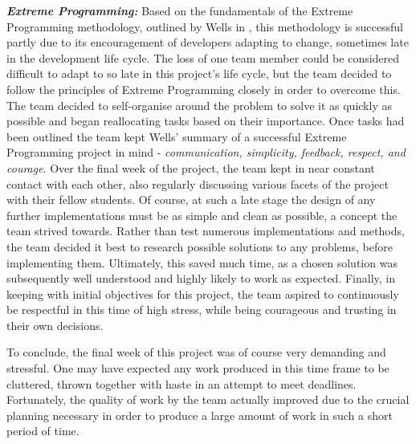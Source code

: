 \textbf{\textit{Extreme Programming:}} Based on the fundamentals of the Extreme Programming methodology, outlined by Wells in \cite{xp}, this methodology is successful partly due to its encouragement of developers adapting to change, sometimes late in the development life cycle. The loss of one team member could be considered difficult to adapt to so late in this project's life cycle, but the team decided to follow the principles of Extreme Programming closely in order to overcome this. The team decided to self-organise around the problem to solve it as quickly as possible \cite{xp} and began reallocating tasks based on their importance. Once tasks had been outlined the team kept Wells' summary of a successful Extreme Programming project in mind - \textit{communication, simplicity, feedback, respect, and courage}. Over the final week of the project, the team kept in near constant contact with each other, also regularly discussing various facets of the project with their fellow students. Of course, at such a late stage the design of any further implementations must be as simple and clean as possible, a concept the team strived towards. Rather than test numerous implementations and methods, the team decided it best to research possible solutions to any problems, before implementing them. Ultimately, this saved much time, as a chosen solution was subsequently well understood and highly likely to work as expected. Finally, in keeping with initial objectives for this project, the team aspired to continuously be respectful in this time of high stress, while being courageous and trusting in their own decisions.

To conclude, the final week of this project was of course very demanding and stressful. One may have expected any work produced in this time frame to be cluttered, thrown together with haste in an attempt to meet deadlines. Fortunately, the quality of work by the team actually improved due to the crucial planning necessary in order to produce a large amount of work in such a short period of time.